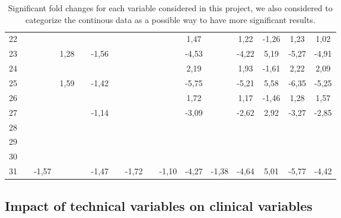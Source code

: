 \documentclass[a4paper, 11pt]{article}
\begin{document}
\begin{multicols}{2}
\begin{table}[t]
{\begin{tabular}{|c|c c|c|c c|c c|c c|c|c c|c|cc|}
22 &  &  &  &  &  &  &  &  &  & \cellcolor[HTML]{FDFF89}1,47 &  & \cellcolor[HTML]{FDFF89}1,22 & \cellcolor[HTML]{B4F5F2}-1,26 & \cellcolor[HTML]{FDFF89}1,23 & \cellcolor[HTML]{FDFF89}1,02 \\
23 &  &  & \cellcolor[HTML]{FDFF89}1,28 &  & \cellcolor[HTML]{B4F5F2}-1,56 &  &  &  &  & \cellcolor[HTML]{4AD7FF}-4,53 &  & \cellcolor[HTML]{4AD7FF}-4,22 & \cellcolor[HTML]{F56B00}5,19 & \cellcolor[HTML]{6F94FF}-5,27 & \cellcolor[HTML]{4AD7FF}-4,91 \\
24 &  &  &  &  &  &  &  &  &  & \cellcolor[HTML]{FDFF89}2,19 &  & \cellcolor[HTML]{FDFF89}1,93 & \cellcolor[HTML]{B4F5F2}-1,61 & \cellcolor[HTML]{FDFF89}2,22 & \cellcolor[HTML]{FDFF89}2,09 \\
25 &  &  & \cellcolor[HTML]{FDFF89}1,59 &  & \cellcolor[HTML]{B4F5F2}-1,42 &  &  &  &  & \cellcolor[HTML]{6F94FF}-5,75 &  & \cellcolor[HTML]{6F94FF}-5,21 & \cellcolor[HTML]{F56B00}5,58 & \cellcolor[HTML]{6F94FF}-6,35 & \cellcolor[HTML]{6F94FF}-5,25 \\
26 &  &  &  &  &  &  &  &  &  & \cellcolor[HTML]{FDFF89}1,72 &  & \cellcolor[HTML]{FDFF89}1,17 & \cellcolor[HTML]{B4F5F2}-1,46 & \cellcolor[HTML]{FDFF89}1,28 & \cellcolor[HTML]{FDFF89}1,57 \\
27 &  &  &  &  & \cellcolor[HTML]{B4F5F2}-1,14 &  &  &  &  & \cellcolor[HTML]{4AD7FF}-3,09 &  & \cellcolor[HTML]{4AD7FF}-2,62 & \cellcolor[HTML]{FFC702}2,92 & \cellcolor[HTML]{4AD7FF}-3,27 & \cellcolor[HTML]{4AD7FF}-2,85 \\
28 &  &  &  &  &  &  &  &  &  &  &  &  &  &  &  \\
29 &  &  &  &  &  &  &  &  &  &  &  &  &  &  &  \\
30 &  &  &  &  &  &  &  &  &  &  &  &  &  &  &  \\
31 &  & \cellcolor[HTML]{B4F5F2}-1,57 &  &  & \cellcolor[HTML]{B4F5F2}-1,47 &  & \cellcolor[HTML]{B4F5F2}-1,72 &  & \cellcolor[HTML]{B4F5F2}-1,10 & \cellcolor[HTML]{4AD7FF}-4,27 & \cellcolor[HTML]{B4F5F2}-1,38 & \cellcolor[HTML]{4AD7FF}-4,64 & \cellcolor[HTML]{F56B00}5,01 & \cellcolor[HTML]{6F94FF}-5,77 & \cellcolor[HTML]{4AD7FF}-4,42 \\
\hline
\end{tabular}}
\caption{Significant fold changes for each variable considered in this project, we also considered to categorize the continous data as a possible way to have more significant results.}
\label{tab:Q2FC}
\end{table}

\subsection{Impact of technical variables on clinical variables}


\end{multicols}
\end{document}
